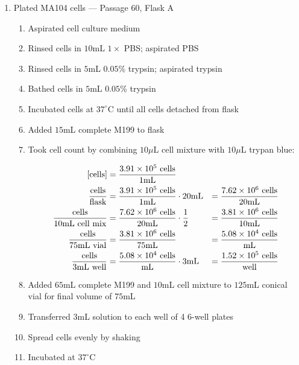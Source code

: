\begin{enumerate}
	\item Plated MA104 cells --- Passage 60, Flask A
		\begin{enumerate}
			\item Aspirated cell culture medium
			\item Rinsed cells in $10$mL $1\times$ PBS; aspirated PBS
			\item Rinsed cells in $5$mL $0.05$\% trypsin; aspirated trypsin
			\item Bathed cells in $5$mL $0.05$\% trypsin
			\item Incubated cells at $37^{\circ}$C until all cells detached from flask
			\item Added $15$mL complete M199 to flask
			\item Took cell count by combining $10\mu$L cell mixture with $10\mu$L trypan blue:
			
				\begin{align*}
				\text{[cells]} &= \frac{3.91\times 10^{5}\text{ cells}}{1\text{mL}} \\
				\frac{\text{cells}}{\text{flask}} &= \frac{3.91\times 10^{5}\text{ cells}}{1\text{mL}} \cdot 20\text{mL} &= \frac{7.62\times 10^{6}\text{ cells}}{20\text{mL}}\\
				\frac{\text{cells}}{10\text{mL cell mix}} &= \frac{7.62\times 10^{6}\text{ cells}}{20\text{mL}}\cdot \frac{1}{2} &= \frac{3.81\times 10^{6}\text{ cells}}{10\text{mL}}\\
				\frac{\text{cells}}{75\text{mL vial}} &= \frac{3.81\times 10^{6}\text{ cells}}{75\text{mL}} &= \frac{5.08\times 10^{4}\text{ cells}}{\text{mL}}\\
				\frac{\text{cells}}{3\text{mL well}} &= \frac{5.08\times 10^{4}\text{ cells}}{\text{mL}} \cdot 3\text{mL} &= \frac{1.52\times 10^{5}\text{ cells}}{\text{well}}\\
				\end{align*}
			\item Added $65$mL complete M199 and $10$mL cell mixture to $125$mL conical vial for final volume of $75$mL
			\item Transferred $3$mL solution to each well of 4 6-well plates
			\item Spread cells evenly by shaking
			\item Incubated at $37^{\circ}$C
		\end{enumerate}
\end{enumerate}